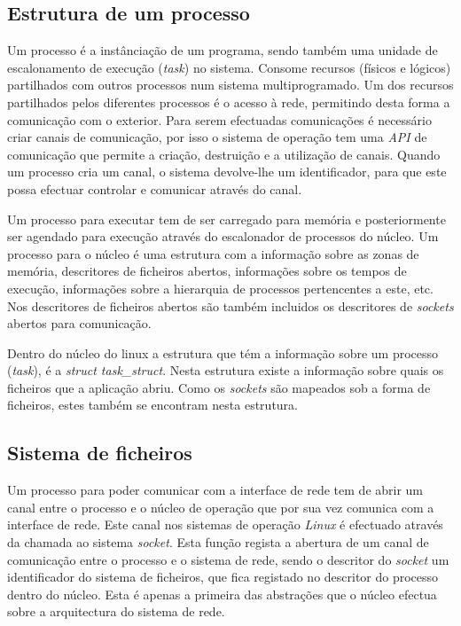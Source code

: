 
\subsection{Estrutura de um processo}

Um processo é a instânciação de um programa, sendo também uma unidade de escalonamento de execução (\textit{task}) no sistema.
Consome recursos (físicos e lógicos) partilhados com outros processos num sistema multiprogramado.
Um dos recursos partilhados pelos diferentes processos é o acesso à rede, permitindo desta forma a comunicação com o exterior.
Para serem efectuadas comunicações é necessário criar canais de comunicação, por isso o sistema de operação tem uma \textit{API} de comunicação que permite a criação, destruição e a utilização de canais.
Quando um processo cria um canal, o sistema devolve-lhe um identificador, para que este possa efectuar controlar e comunicar através do canal.




Um processo para executar tem de ser carregado para memória e posteriormente ser agendado para execução através do escalonador de processos do núcleo.
 Um processo para o núcleo é uma estrutura com a informação sobre as zonas de memória, descritores de ficheiros abertos, informações sobre os tempos de execução, informações sobre a hierarquia de processos pertencentes a este, etc.
 Nos descritores de ficheiros abertos são também incluidos os descritores de \textit{sockets} abertos para comunicação. 

 Dentro do núcleo do linux a estrutura que tém a informação sobre um processo (\textit{task}), é a \textit{struct task\_struct}. 
 Nesta estrutura existe a informação sobre quais os ficheiros que a aplicação abriu.
 Como os \textit{sockets} são mapeados sob a forma de ficheiros, estes também se encontram nesta estrutura.

\subsection{Sistema de ficheiros}

Um processo para poder comunicar com a interface de rede tem de abrir um canal entre o processo e o núcleo de operação que por sua vez comunica com a interface de rede.
 Este canal nos sistemas de operação \textit{Linux} é efectuado através da chamada ao sistema \textit{socket}.
 Esta função regista a abertura de um canal de comunicação entre o processo e o sistema de rede, sendo o descritor do \textit{socket} um identificador do sistema de ficheiros, que fica registado no descritor do processo dentro do núcleo.
 Esta é apenas a primeira das abstrações que o núcleo efectua sobre a arquitectura do sistema de rede.
  


